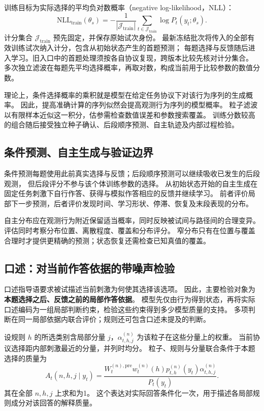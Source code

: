 \documentclass[11pt,a4paper]{article}
\numberwithin{equation}{section}
\begin{document}
训练目标为实际选择的平均负对数概率（negative log-likelihood，NLL）：
\begin{equation}
\mathrm{NLL}_{\mathrm{train}}(\theta_s)=
-\frac{1}{|\mathcal J_{\mathrm{train}}|}
\sum_{t\in\mathcal J_{\mathrm{train}}}\log P_t(y_t;\theta_s).
\label{eq:objective}
\end{equation}
计分集合 $\mathcal J_{\mathrm{train}}$ 预先固定，并保存原始试次身份。
最新冻结批次将传入的全部有效训练试次纳入计分，包含从初始状态产生的首题预测；
每题选择与反馈随后进入学习。旧入口中的首题处理须按各自协议复现，跨版本比较先核对计分集合。
多次独立滤波在每题先平均选择概率，再取对数，构成当前用于比较参数的数值分数。

理论上，条件选择概率的乘积就是模型在给定任务协议下对该行为序列的生成概率。
因此，提高准确计算的序列似然会提高观测行为序列的模型概率。
粒子滤波以有限样本近似这一积分，估参需检查数值误差和参数搜索覆盖。
训练分数较高的组合随后接受独立种子确认、后段顺序预测、自主轨迹及内部过程检验。

\subsection{条件预测、自主生成与验证边界}
条件预测每题使用此前真实选择与反馈；后段顺序预测可以继续吸收已发生的后段观测，
但后段评分不参与该个体训练参数的选择。
从初始状态开始的自主生成在固定任务刺激下自行作答、获得与模拟作答相应的反馈并继续学习。
前者评价局部下一步预测，后者评价发现时间、学习形状、停滞、恢复及末段表现的分布。

自主分布应在观测行为附近保留适当概率，同时反映被试间与路径间的合理变异。
评估同时考察分布位置、离散程度、覆盖和分布评分。
窄分布只有在位置与覆盖合理时才提供更精确的预测；状态恢复还需检查已知真值的覆盖。

\subsection{口述：对当前作答依据的带噪声检验}
\label{sec:oral}
口述指导语要求被试描述当前刺激为何使其选择该选项。
因此，主要检验对象为\textbf{本题选择之后、反馈之前的局部作答依据}。
模型先仅由行为得到状态，再将实际口述编码为一组局部判断约束，检验这些约束得到多少模型质量的支持。
多项判断在同一局部依据内联合评价；规则还可包含口述未提及的判断。

设规则 $h$ 的所选类别含局部分量 $j$，$\alpha_{t,h,j}^{(n)}$ 为该粒子在这些分量上的权重。
当前协议选择距内部刺激最近的分量，并列时均分。
粒子、规则与分量联合条件于本题选择的质量为
\begin{equation}
A_t(n,h,j\mid y_t)=
\frac{W_t^{(n),\mathrm{pre}}w_t^{(n)}(h)
p_{t,h}^{(n)}(y_t)\alpha_{t,h,j}^{(n)}}{P_t(y_t)}.
\label{eq:oral-responsibility}
\end{equation}
其在全部 $n,h,j$ 上求和为1。
这个表达对实际回答条件化一次，用于描述各局部规则成分对该回答的解释质量。
\end{document}
